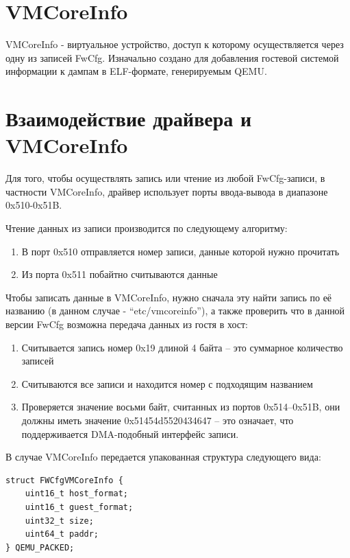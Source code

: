 \documentclass{mipt-thesis-bs}
\begin{document}
\section*{VMCoreInfo}

VMCoreInfo - виртуальное устройство, доступ к которому осуществляется через одну из записей FwCfg. Изначально создано для добавления гостевой системой информации к дампам в ELF-формате, генерируемым QEMU.

\section*{Взаимодействие драйвера и VMCoreInfo}

Для того, чтобы осуществлять запись или чтение из любой FwCfg-записи, в частности VMCoreInfo, драйвер использует порты ввода-вывода в диапазоне 0x510-0x51B. 

Чтение данных из записи производится по следующему алгоритму:
\begin{enumerate}
\item В порт 0x510 отправляется номер записи, данные которой нужно прочитать
\item Из порта 0x511 побайтно считываются данные
\end{enumerate}

Чтобы записать данные в VMCoreInfo, нужно сначала эту найти запись по её названию (в данном случае - “etc/vmcoreinfo”), а также проверить что в данной версии FwCfg возможна передача данных из гостя в хост:

\begin{enumerate}
\item Считывается запись номер 0x19 длиной 4 байта -- это суммарное количество записей
\item Считываются все записи и находится номер с подходящим названием
\item Проверяется значение восьми байт, считанных из портов 0x514--0x51B, они должны иметь значение 0x51454d5520434647 -- это означает, что поддерживается DMA-подобный интерфейс записи.
\end{enumerate}

В случае VMCoreInfo передается упакованная структура следующего вида:

\begin{lstlisting}
struct FWCfgVMCoreInfo {
    uint16_t host_format;
    uint16_t guest_format;
    uint32_t size;
    uint64_t paddr;
} QEMU_PACKED;
\end{lstlisting}
\end{document}
